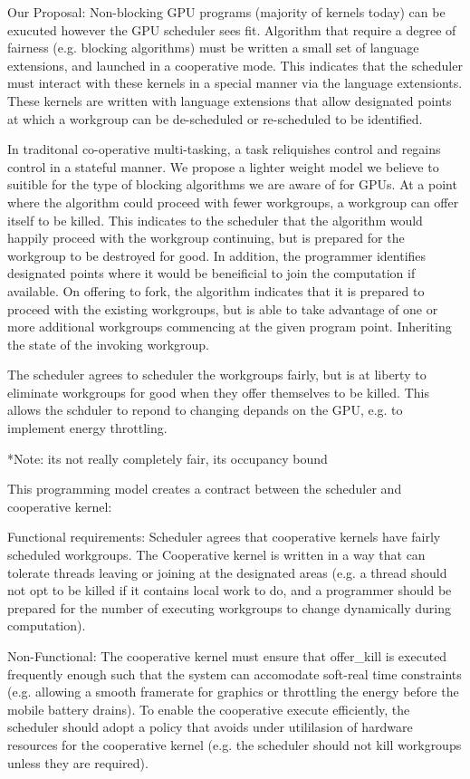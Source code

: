 \documentclass[nocopyrightspace]{sigplanconf-pldi16}
\begin{document}
  Our Proposal: Non-blocking GPU programs (majority of kernels today)
  can be exucuted however the GPU scheduler sees fit. Algorithm that
  require a degree of fairness (e.g. blocking algorithms) must be
  written a small set of language extensions, and launched in a
  cooperative mode. This indicates that the scheduler must interact
  with these kernels in a special manner via the language
  extensionts. These kernels are written with language extensions that
  allow designated points at which a workgroup can be de-scheduled or
  re-scheduled to be identified.

  In traditonal co-operative multi-tasking, a task reliquishes control
  and regains control in a stateful manner. We propose a lighter
  weight model we believe to suitible for the type of blocking
  algorithms we are aware of for GPUs. At a point where the algorithm
  could proceed with fewer workgroups, a workgroup can offer itself
  to be killed. This indicates to the scheduler that the algorithm
  would happily proceed with the workgroup continuing, but is prepared
  for the workgroup to be destroyed for good. In addition, the programmer
  identifies designated points where it would be beneificial to join the
  computation if available. On offering to fork, the algorithm indicates
  that it is prepared to proceed with the existing workgroups, but is able
  to take advantage of one or more additional workgroups commencing at the
  given program point. Inheriting the state of the invoking workgroup.

  The scheduler agrees to scheduler the workgroups fairly, but is at
  liberty to eliminate workgroups for good when they offer themselves
  to be killed. This allows the schduler to repond to changing depands
  on the GPU, e.g. to implement energy throttling.

  *Note: its not really completely fair, its occupancy bound

  This programming model creates a contract between the scheduler
  and cooperative kernel:

  Functional requirements: Scheduler agrees that cooperative kernels
  have fairly scheduled workgroups. The Cooperative kernel is written
  in a way that can tolerate threads leaving or joining at the
  designated areas (e.g. a thread should not opt to be killed if it
  contains local work to do, and a programmer should be prepared for
  the number of executing workgroups to change dynamically during
  computation).

  Non-Functional: The cooperative kernel must ensure that offer_kill
  is executed frequently enough such that the system can accomodate
  soft-real time constraints (e.g. allowing a smooth framerate for
  graphics or throttling the energy before the mobile battery drains).
  To enable the cooperative execute efficiently, the scheduler should
  adopt a policy that avoids under utililasion of hardware resources
  for the cooperative kernel (e.g. the scheduler should not kill
  workgroups unless they are required).
\end{document}

